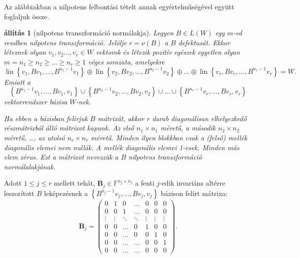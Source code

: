 \documentclass[a4paper, showtrims]{memoir}
\theoremstyle{plain}
\newtheorem{proposition}{állítás}[chapter]
\theoremstyle{remark}
\theoremstyle{definition}
\DeclareMathOperator{\lin}{lin}
\begin{document}
Az alábbiakban a nilpotens felbontási tételt annak egyértelműségével együtt foglaljuk össze.
\begin{proposition}[nilpotens transzformáció normálakja]\label{pr:nilpnormal}
	Legyen $B\in L\left( W \right)$ egy $m$-ed rendben nilpotens transzformáció.
	Jelölje $r=\nu\left( B \right)$ a $B$ defektusát.
	Ekkor léteznek olyan $v_1,v_2\dots,v_r\in W$ vektorok és
	létezik pozitív egészek egyetlen olyan $m=n_1\geq n_2\geq \dots\geq n_r\geq 1$ véges sorozata,
	amelyekre
	\[
		\lin\left\{ v_1,Bv_1,\ldots,B^{n_1-1}v_1 \right\}
		\oplus
		\lin\left\{ v_2,Bv_2,\ldots,B^{n_2-1}v_2 \right\}
		\oplus
		\ldots
		\oplus
		\lin\left\{ v_r,Bv_r,\ldots,B^{n_r-1}v_r \right\}
		=
		W.
	\]
	Emiatt a
	\[
		\left\{ B^{n_1-1}v_1,\ldots,Bv_1,v_1 \right\}
		\cup
		\left\{ B^{n_2-1}v_2,\ldots,Bv_2,v_2 \right\}
		\cup
		\ldots
		\cup
		\left\{ B^{n_r-1}v_r,\ldots,Bv_r,v_r \right\}
		\tag{\dag}
	\]
	vektorrendszer bázisa $W$-nek.

	Ha ebben a bázisban felírjuk $B$ mátrixát,
	akkor $r$ darab diagonálisan elhelyezkedő részmátrixból álló mátrixot kapunk.
	Az első $n_1\times n_1$ méretű,
	a második $n_2\times n_2$ méretű, \dots, az utolsó $n_r\times n_r$ méretű.
	Minden ilyen blokkban csak a (felső) mellék diagonális elemei nem nullák.
	A mellék diagonális elemei 1-esek.
	Minden más elem zérus.
	Ezt a mátrixot nevezzük a $B$ nilpotens transzformáció \emph{normálalakjának}.
\end{proposition}
Adott $1\leq j\leq r$ mellett tehát, $\mathbf{B}_j\in \mathbb{F}^{n_j\times n_j}$
a fenti $j$-edik invariáns altérre leszorított $B$ leképezésnek a
\begin{math}
	\left\{ B^{n_j-1}v_j,\ldots,Bv_j,v_j \right\}
\end{math}
bázison felírt mátrixa:
\[
	\mathbf{B}_j
	=
	\begin{pmatrix}
		0      & 1      & 0      & \dots  & 0      & 0      & 0      \\
		0      & 0      & 1      & \dots  & 0      & 0      & 0      \\
		\vdots & \vdots & \ddots & \ddots & \vdots & \vdots & \vdots \\
		0      & 0      & \dots  & 0      & 1      & 0      & 0      \\
		0      & 0      & \dots  & 0      & 0      & 1      & 0      \\
		0      & 0      & \dots  & \dots  & 0      & 0      & 1      \\
		0      & 0      & \dots  & \dots  & 0      & 0      & 0
	\end{pmatrix}.
\]
\end{document}
